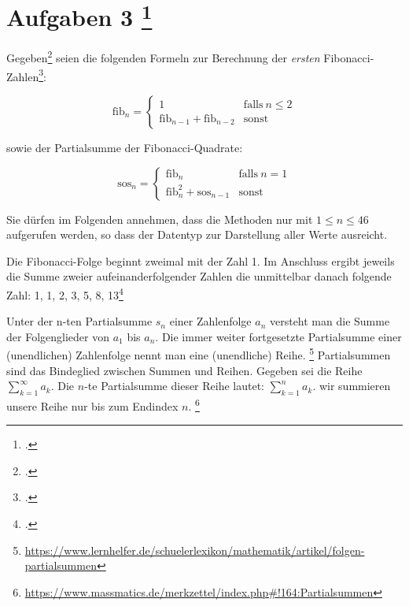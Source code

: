 \documentclass{lehramt-informatik-aufgabe}
\begin{document}

\section{Aufgaben 3
\footcite[Seite 1, Aufgabe 1]{aud:pu:3}}

Gegeben\footcite[Thema 1 Aufgabe 3 Seite 5]{examen:66115:2017:03} seien
die folgenden Formeln zur Berechnung der \emph{ersten}
Fibonacci-Zahlen\footcite{wiki:fibonacci-folge}:

\begin{equation*}
\text{fib}_n =
\begin{cases}
1 & \text{falls}\ n \leq 2\\
\text{fib}_{n-1} + \text{fib}_{n-2} & \text{sonst}
\end{cases}
\end{equation*}

\noindent
sowie der Partialsumme der Fibonacci-Quadrate:

\begin{equation*}
\text{sos}_n =
\begin{cases}
\text{fib}_n & \text{falls}\ n = 1\\
\text{fib}_n^2 + \text{sos}_{n-1} & \text{sonst}
\end{cases}
\end{equation*}

\noindent
Sie dürfen im Folgenden annehmen, dass die Methoden nur mit $1 \leq n
\leq 46$ aufgerufen werden, so dass der Datentyp  zur
Darstellung aller Werte ausreicht.

\begin{liExkurs}
Die Fibonacci-Folge beginnt zweimal mit der Zahl 1. Im Anschluss ergibt
jeweils die Summe zweier aufeinanderfolgender Zahlen die unmittelbar
danach folgende Zahl: 1, 1, 2, 3, 5, 8,
13\footcite{wiki:fibonacci-folge}
\end{liExkurs}

\begin{liExkurs}[Partialsumme]
Unter der n-ten Partialsumme $s_n$ einer Zahlenfolge $a_n$ versteht man
die Summe der Folgenglieder von $a_1$ bis $a_n$. Die immer
weiter fortgesetzte Partialsumme einer (unendlichen) Zahlenfolge nennt
man eine (unendliche) Reihe.
\footnote{\url{https://www.lernhelfer.de/schuelerlexikon/mathematik/artikel/folgen-partialsummen}}
Partialsummen sind das Bindeglied zwischen Summen und Reihen.
Gegeben sei die Reihe $\sum_{k = 1}^{\infty} a_k$.
Die $n$-te Partialsumme dieser Reihe lautet: $\sum_{k = 1}^{n} a_k$.
\dh wir summieren unsere Reihe nur bis zum Endindex $n$.
\footnote{\url{https://www.massmatics.de/merkzettel/index.php\#!164:Partialsummen}}
\end{liExkurs}
\end{document}
